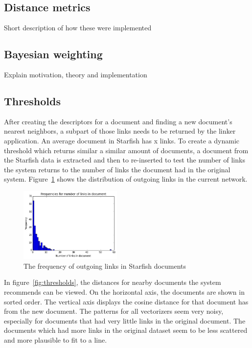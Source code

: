 \subsection{Distance metrics}
Short description of how these were implemented

\subsection{Bayesian weighting}
Explain motivation, theory and implementation 

\subsection{Thresholds}
After creating the descriptors for a document and finding a new document's nearest neighbors, a subpart of those links needs to be returned by the linker application. An average document in Starfish has x links. To create a dynamic threshold which returns similar a similar amount of documents, a document from the Starfish data is extracted and then to re-inserted to test the number of links the system returns to the number of links the document had in the original system. Figure~\ref{fig:link_histogram} shows the distribution of outgoing links in the current network.

\begin{figure}[h]
\includegraphics[width =0.45\textwidth]{images/link_histogram}
\caption{The frequency of outgoing links in Starfish documents}
\label{fig:link_histogram}
\end{figure}

In figure~\ref{fig:thresholds}, the distances for nearby documents the system recommends can be viewed. On the horizontal axis, the documents are shown in sorted order. The vertical axis displays the cosine distance for that document has from the new document. The patterns for all vectorizers seem very noisy, especially for documents that had very little links in the original document. The documents which had more links in the original dataset seem to be less scattered and more plausible to fit to a line.

